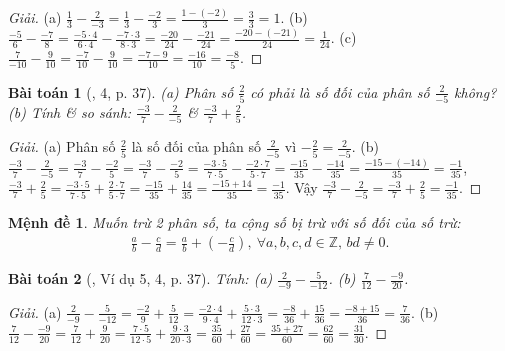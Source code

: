 \documentclass{article}
\newtheorem{baitoan}{Bài toán}
\newtheorem{menhde}{Mệnh đề}
\begin{document}
\begin{proof}[Giải]
	(a) $\frac{1}{3} - \frac{2}{-3} = \frac{1}{3} - \frac{-2}{3} = \frac{1 -(-2)}{3} = \frac{3}{3} = 1$. (b) $\frac{-5}{6} - \frac{-7}{8} = \frac{-5\cdot4}{6\cdot4} - \frac{-7\cdot3}{8\cdot3} = \frac{-20}{24} - \frac{-21}{24} = \frac{-20 -(-21)}{24} = \frac{1}{24}$. (c) $\frac{7}{-10} - \frac{9}{10} = \frac{-7}{10} - \frac{9}{10} = \frac{-7 - 9}{10} = \frac{-16}{10} = \frac{-8}{5}$.
\end{proof}

\begin{baitoan}[\cite{SGK_Toan_6_Canh_Dieu_tap_2}, 4, p. 37]
	(a) Phân số $\frac{2}{5}$ có phải là số đối của phân số $\frac{2}{-5}$ không? (b) Tính \& so sánh: $\frac{-3}{7} - \frac{2}{-5}$ \& $\frac{-3}{7} + \frac{2}{5}$.
\end{baitoan}

\begin{proof}[Giải]
	(a) Phân số $\frac{2}{5}$ là số đối của phân số $\frac{2}{-5}$ vì $-\frac{2}{5} = \frac{2}{-5}$. (b) $\frac{-3}{7} - \frac{2}{-5} = \frac{-3}{7} - \frac{-2}{5} = \frac{-3}{7} - \frac{-2}{5} = \frac{-3\cdot5}{7\cdot5} - \frac{-2\cdot7}{5\cdot7} = \frac{-15}{35} - \frac{-14}{35} = \frac{-15 -(-14)}{35} = \frac{-1}{35}$, $\frac{-3}{7} + \frac{2}{5} = \frac{-3\cdot5}{7\cdot5} + \frac{2\cdot7}{5\cdot7} = \frac{-15}{35} + \frac{14}{35} = \frac{-15 + 14}{35} = \frac{-1}{35}$. Vậy $\frac{-3}{7} - \frac{2}{-5} = \frac{-3}{7} + \frac{2}{5} = \frac{-1}{35}$.
\end{proof}

\begin{menhde}
	Muốn trừ 2 phân số, ta cộng số bị trừ với số đối của số trừ:
	\begin{align*}
		\frac{a}{b} - \frac{c}{d} = \frac{a}{b} + \left(-\frac{c}{d}\right),\ \forall a,b,c,d\in\mathbb{Z},\,bd\ne0.
	\end{align*}
\end{menhde}

\begin{baitoan}[\cite{SGK_Toan_6_Canh_Dieu_tap_2}, Ví dụ 5, 4, p. 37]
	Tính: (a) $\frac{2}{-9} - \frac{5}{-12}$. (b) $\frac{7}{12} - \frac{-9}{20}$.
\end{baitoan}

\begin{proof}[Giải]
	(a) $\frac{2}{-9} - \frac{5}{-12} = \frac{-2}{9} + \frac{5}{12} = \frac{-2\cdot4}{9\cdot4} + \frac{5\cdot3}{12\cdot3} = \frac{-8}{36} + \frac{15}{36} = \frac{-8 + 15}{36} = \frac{7}{36}$. (b) $\frac{7}{12} - \frac{-9}{20} = \frac{7}{12} + \frac{9}{20} = \frac{7\cdot5}{12\cdot5} + \frac{9\cdot3}{20\cdot3} = \frac{35}{60} + \frac{27}{60} = \frac{35 + 27}{60} = \frac{62}{60} = \frac{31}{30}$.
\end{proof}
\end{document}
